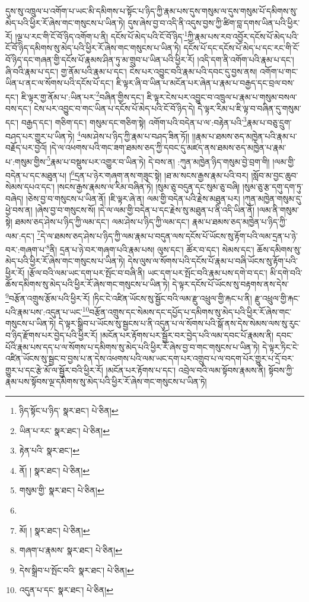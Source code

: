 དུས་སུ་འཁྲུལ་པ་འགོག་པ་ཡང་མི་དམིགས་པ་སྟོང་པ་ཉིད་ཀྱི་རྣམ་པས་དུས་གསུམ་ལ་དུས་གསུམ་པོ་དམིགས་སུ་མེད་པའི་ཕྱིར་རོ་ཞེས་གང་གསུངས་པ་ཡིན་ཏེ། དུས་ཞེས་བྱ་བ་འདི་ནི་འདུས་བྱས་ཀྱི་ཚིག་བླ་དགས་ཡིན་པའི་ཕྱིར་རོ། །ལྔ་པ་རང་གི་ངོ་བོ་ཉིད་འགོག་པ་ནི། དངོས་པོ་མེད་པའི་ངོ་བོ་ཉིད་\footnote{ཉིད་སྟོང་པ་ཉིད་  སྣར་ཐང་།  པེ་ཅིན། }ཀྱི་རྣམ་པས་རབ་འབྱོར་དངོས་པོ་མེད་པའི་ངོ་བོ་ཉིད་དམིགས་སུ་མེད་པའི་ཕྱིར་རོ་ཞེས་གང་གསུངས་པ་ཡིན་ཏེ། དངོས་པོ་དང་དངོས་པོ་མེད་པ་དང་རང་གི་ངོ་བོ་ཉིད་དང་གཞན་གྱི་དངོས་པོ་རྣམས་ཤིན་ཏུ་མ་གྲུབ་པ་ཡིན་པའི་ཕྱིར་རོ། །འདི་དག་ནི་འགོག་པའི་རྣམ་པ་དང་། ཞི་བའི་རྣམ་པ་དང་། གྱ་ནོམ་པའི་རྣམ་པ་དང་། ངེས་པར་འབྱུང་བའི་རྣམ་པའི་དབང་དུ་བྱས་ནས། འགོག་པ་གང་ཡིན་པ་ནང་ལ་སོགས་པའི་དངོས་པོ་དང་། ཇི་ལྟར་ཞི་བ་ཡིན་པ་མངོན་པར་ཞེན་པ་རྣམ་པ་བརྒྱད་དང་བྲལ་བས་དང་། ཇི་ལྟར་གྱ་ནོམ་པ་:ཡིན་པར་\footnote{ཡིན་པ་རང་  སྣར་ཐང་།  པེ་ཅིན། }བཞིན་གྱིས་དང་། ཇི་ལྟར་ངེས་པར་འབྱུང་བ་འཁྲུལ་པ་རྣམ་པ་གསུམ་བསལ་བས་དང་། ངེས་པར་འབྱུང་བ་གང་ཡིན་པ་དངོས་པོ་མེད་པའི་ངོ་བོ་ཉིད་དེ། དེ་ལྟར་རིམ་པ་ཇི་ལྟ་བ་བཞིན་དུ་གསུམ་དང་། བརྒྱད་དང་། གཅིག་དང་། གསུམ་དང་གཅིག་སྟེ། འགོག་པའི་བདེན་པ་ལ་:བརྟེན་པའི་\footnote{རྟེན་པའི་  སྣར་ཐང་། }རྣམ་པ་བཅུ་དྲུག་བཤད་པར་གྱུར་པ་ཡིན་ཏེ། \footnote{ནོ། །   སྣར་ཐང་།  པེ་ཅིན། }ལམ་ཤེས་པ་ཉིད་ཀྱི་རྣམ་པ་བཤད་ཟིན་ཏོ།། །།རྣམ་པ་ཐམས་ཅད་མཁྱེན་པའི་རྣམ་པ་བརྗོད་པར་བྱའོ། །དེ་ལ་འཕགས་པའི་གང་ཟག་ཐམས་ཅད་ཀྱི་དབང་དུ་མཛད་ནས་ཐམས་ཅད་མཁྱེན་པ་རྣམ་པ་:གསུམ་གྱིས་\footnote{གསུམ་གྱི་  སྣར་ཐང་།  པེ་ཅིན། }རྣམ་པ་བསྡུས་པར་འགྱུར་བ་ཡིན་ཏེ། དེ་བས་ན། :ཀུན་མཁྱེན་ཉིད་གསུམ་བྱེ་བྲག་གི། །ལམ་གྱི་བདེན་པ་དང་མཐུན་པ། །\footnote{}དྲན་པ་ཉེར་གཞག་ནས་གཟུང་སྟེ། །ཐ་མ་སངས་རྒྱས་རྣམ་པའི་བར། །སློབ་མ་བྱང་ཆུབ་སེམས་དཔའ་དང་། །སངས་རྒྱས་རྣམས་ལ་རིམ་བཞིན་ཏེ། །སུམ་ཅུ་བདུན་དང་སུམ་ཅུ་བཞི། །སུམ་ཅུ་རྩ་དགུ་དག་ཏུ་བཞེད། །ཅེས་བྱ་བ་གསུངས་པ་ཡིན་ནོ། །ཇི་ལྟར་ཞེ་ན། ལམ་གྱི་བདེན་པའི་རྗེས་མཐུན་པར། །ཀུན་མཁྱེན་གསུམ་དུ་ཕྱེ་བས་ན། །ཞེས་བྱ་བ་གསུངས་སོ། །དེ་ལ་ལམ་གྱི་བདེན་པ་དང་རྗེས་སུ་མཐུན་པ་ནི་འདི་ཡིན་ནོ། །ལམ་ནི་གསུམ་སྟེ། ཐམས་ཅད་ཤེས་པ་ཉིད་ཀྱི་ལམ་དང་། ལམ་ཤེས་པ་ཉིད་ཀྱི་ལམ་དང་། རྣམ་པ་ཐམས་ཅད་མཁྱེན་པ་ཉིད་ཀྱི་ལམ་:དང་། \footnote{མོ། །   སྣར་ཐང་།  པེ་ཅིན། }དེ་ལ་ཐམས་ཅད་ཤེས་པ་ཉིད་ཀྱི་ལམ་རྣམ་པ་བདུན་ལས་དངོས་པོ་ཡོངས་སུ་རྟོག་པའི་ལམ་དྲན་པ་ཉེ་བར་:གཞག་པ་\footnote{གཞག་པ་རྣམས་  སྣར་ཐང་།  པེ་ཅིན། }ནི། དྲན་པ་ཉེ་བར་གཞག་པའི་རྣམ་པས། ལུས་དང་། ཚོར་བ་དང་། སེམས་དང་། ཆོས་དམིགས་སུ་མེད་པའི་ཕྱིར་རོ་ཞེས་གང་གསུངས་པ་ཡིན་ཏེ། དེས་ལུས་ལ་སོགས་པའི་དངོས་པོ་རྣམ་པ་བཞི་ཡོངས་སུ་རྟོག་པའི་ཕྱིར་རོ། །རྩོལ་བའི་ལམ་ཡང་དག་པར་སྤོང་བ་བཞི་ནི། ཡང་དག་པར་སྤོང་བའི་རྣམ་པས་དགེ་བ་དང་། མི་དགེ་བའི་ཆོས་དམིགས་སུ་མེད་པའི་ཕྱིར་རོ་ཞེས་གང་གསུངས་པ་ཡིན་ཏེ། དེ་ལྟར་དངོས་པོ་ཡོངས་སུ་བརྟགས་ནས་དེས་\footnote{དེས་སྒྲིབ་པ་སྤོང་བའི་  སྣར་ཐང་།  པེ་ཅིན། }བརྩོན་འགྲུས་རྩོམ་པའི་ཕྱིར་རོ། །ཏིང་ངེ་འཛིན་ཡོངས་སུ་སྦྱོང་བའི་ལམ་རྫུ་འཕྲུལ་གྱི་རྐང་པ་ནི། རྫུ་འཕྲུལ་གྱི་རྐང་པའི་རྣམ་པས་:འདུན་པ་ཡང་\footnote{འདུན་པ་དང་  སྣར་ཐང་།  པེ་ཅིན། }བརྩོན་འགྲུས་དང་སེམས་དང་དཔྱོད་པ་དམིགས་སུ་མེད་པའི་ཕྱིར་རོ་ཞེས་གང་གསུངས་པ་ཡིན་ཏེ། དེ་ལྟར་སྒྲིབ་པ་ཡོངས་སུ་སྦྱངས་པ་ནི་འདུན་པ་ལ་སོགས་པའི་སྒོ་ནས་དེས་སེམས་ལས་སུ་རུང་བ་ཉིད་རྫོགས་པར་བྱེད་པའི་ཕྱིར་རོ། །མངོན་པར་རྟོགས་པར་སྦྱོར་བར་བྱེད་པའི་ལམ་དབང་པོ་རྣམས་ནི། དབང་པོའི་རྣམ་པས་དད་པ་ལ་སོགས་པ་དམིགས་སུ་མེད་པའི་ཕྱིར་རོ་ཞེས་བྱ་བ་གང་གསུངས་པ་ཡིན་ཏེ། དེ་ལྟར་ཏིང་ངེ་འཛིན་ཡོངས་སུ་སྦྱང་བ་བྱས་པ་ན་དེས་འཕགས་པའི་ལམ་ཡང་དག་པར་འགྲུབ་པ་ལ་བདག་པོར་གྱུར་པ་དྲོ་བར་གྱུར་པ་དང་རྩེ་མོ་ལ་སྦྱོར་བའི་ཕྱིར་རོ། །མངོན་པར་རྟོགས་པ་དང་། འབྲེལ་བའི་ལམ་སྟོབས་རྣམས་ནི། སྟོབས་ཀྱི་རྣམ་པས་སྟོབས་ལྔ་དམིགས་སུ་མེད་པའི་ཕྱིར་རོ་ཞེས་གང་གསུངས་པ་ཡིན་ཏེ། 
